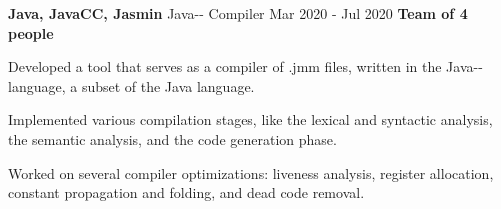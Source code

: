 \cventry
  {\textbf{Java, JavaCC, Jasmin}}
  {Java-{}- Compiler \href{https://github.com/EduRibeiro00/JMMCompiler-feup-comp}{\faExternalLink}} %
  {Mar 2020 - Jul 2020}
  {\textbf{Team of 4 people}}
  {
    \begin{cvitems} %
      \item {Developed a tool that serves as a compiler of .jmm files, written in the Java-{}- language, a subset of the Java language.}
      \item {Implemented various compilation stages, like the lexical and syntactic analysis, the semantic analysis, and the code generation phase.}
      \item {Worked on several compiler optimizations: liveness analysis, register allocation, constant propagation and folding, and dead code removal.}
    \end{cvitems}
  }